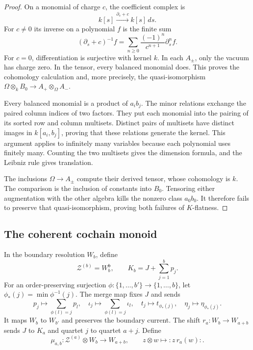 \begin{proof}
On a monomial of charge $c$, the coefficient complex is
\[
 k[s]\xrightarrow{\partial_s+c}k[s]\,ds.
\]
For $c\ne0$ its inverse on a polynomial $f$ is the finite sum
\[
 (\partial_s+c)^{-1}f
 =\sum_{n\geq0}\frac{(-1)^n}{c^{n+1}}\partial_s^nf.
\]
For $c=0$, differentiation is surjective with kernel $k$.
In each $A_\pm$, only the vacuum has charge zero.
In the tensor, every balanced monomial does.
This proves the cohomology calculation and, more precisely,
the quasi-isomorphism
$\Omega\otimes_kB_0\to A_+\otimes_\Omega A_-$.

Every balanced monomial is a product of $a_ib_j$.
The minor relations exchange the paired column indices of two
factors. They put each monomial into the pairing of its sorted
row and column multisets. Distinct pairs of multisets have
distinct images in $k[a_i,b_j]$, proving that these relations
generate the kernel. This argument applies to infinitely many
variables because each polynomial uses finitely many.
Counting the two multisets gives the dimension formula,
and the Leibniz rule gives translation.

The inclusions $\Omega\to A_\pm$ compute their derived tensor,
whose cohomology is $k$. The comparison is the inclusion of
constants into $B_0$. Tensoring either augmentation with the
other algebra kills the nonzero class $a_0b_0$.
It therefore fails to preserve that quasi-isomorphism,
proving both failures of $K$-flatness.
\end{proof}

\subsection{The coherent cochain monoid}

In the boundary resolution $W_b$, define
\[
 \mathcal Z^{(b)}=W_b^{\mathfrak b},
 \qquad K_b=J+\sum_{j=1}^bp_j.
\]
For an order-preserving surjection
$\phi:\{1,\ldots,b'\}\to\{1,\ldots,b\}$, let
$\phi_*(j)=\min\phi^{-1}(j)$. The merge map fixes $J$ and sends
\[
 p_j\mapsto\sum_{\phi(l)=j}p_l,\quad
 \iota_j\mapsto\sum_{\phi(l)=j}\iota_l,\quad
 t_j\mapsto t_{\phi_*(j)},\quad
 \eta_j\mapsto\eta_{\phi_*(j)}.
\]
It maps $W_b$ to $W_{b'}$ and preserves the boundary current.
The shift $r_a:W_b\to W_{a+b}$ sends $J$ to $K_a$ and
quartet $j$ to quartet $a+j$. Define
\[
 \mu_{a,b}:\mathcal Z^{(a)}\otimes W_b\longrightarrow W_{a+b},
 \qquad z\otimes w\longmapsto :z\,r_a(w):.
\]

